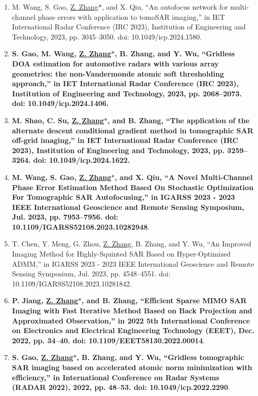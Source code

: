 \documentclass[paper=a4,fontsize=11pt]{scrartcl}
\begin{document}
\begin{enumerate}
	\item M. Wang, S. Gao, \underline{Z. Zhang$\ast$}, and X. Qiu, ``An autofocus network for multi-channel phase errors with application to tomoSAR imaging,'' in IET International Radar Conference (IRC 2023), Institution of Engineering and Technology, 2023, pp. 3045–3050. doi: 10.1049/icp.2024.1580.
	
	\item \textbf{S. Gao, M. Wang, \underline{Z. Zhang$\ast$}, B. Zhang, and Y. Wu, ``Gridless DOA estimation for automotive radars with various array geometries: the non-Vandermonde atomic soft thresholding approach,'' in IET International Radar Conference (IRC 2023), Institution of Engineering and Technology, 2023, pp. 2068–2073. doi: 10.1049/icp.2024.1406.}
	
	\item \textbf{M. Shao, C. Su, \underline{Z. Zhang$\ast$}, and B. Zhang, ``The application of the alternate descent conditional gradient method in tomographic SAR off-grid imaging,'' in IET International Radar Conference (IRC 2023), Institution of Engineering and Technology, 2023, pp. 3259–3264. doi: 10.1049/icp.2024.1622.}
	
	\item \textbf{ M. Wang, S. Gao, \underline{Z. Zhang$\ast$}, and X. Qiu, ``A Novel Multi-Channel Phase Error Estimation Method Based On Stochastic Optimization For Tomographic SAR Autofocusing,'' in IGARSS 2023 - 2023 IEEE International Geoscience and Remote Sensing Symposium, Jul. 2023, pp. 7953–7956. doi: 10.1109/IGARSS52108.2023.10282948}.
	
	\item T. Chen, Y. Meng, G. Zhou, \underline{Z. Zhang}, B. Zhang, and Y. Wu, ``An Improved Imaging Method for Highly-Squinted SAR Based on Hyper-Optimized ADMM,'' in IGARSS 2023 - 2023 IEEE International Geoscience and Remote Sensing Symposium, Jul. 2023, pp. 4548–4551. doi: 10.1109/IGARSS52108.2023.10281842.
	
	\item \textbf{P. Jiang, \underline{Z. Zhang$\ast$}, and B. Zhang, ``Efficient Sparse MIMO SAR Imaging with Fast Iterative Method Based on Back Projection and Approximated Observation,'' in 2022 5th International Conference on Electronics and Electrical Engineering Technology (EEET), Dec. 2022, pp. 34–40. doi: 10.1109/EEET58130.2022.00014}.
	
	\item \textbf{S. Gao, \underline{Z. Zhang$\ast$}, B. Zhang, and Y. Wu, ``Gridless tomographic SAR imaging based on accelerated atomic norm minimization with efficiency,'' in International Conference on Radar Systems (RADAR 2022), 2022, pp. 48–53. doi: 10.1049/icp.2022.2290}.
	

\end{enumerate}
\end{document}
